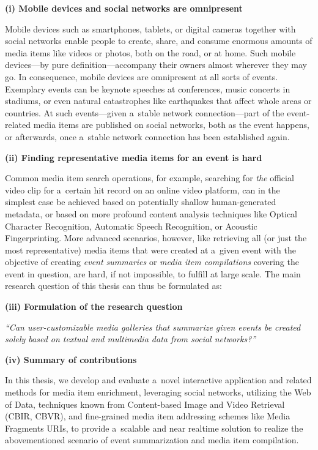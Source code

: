 
\begin{abstracts}

\textbf{(i) Mobile devices and social networks are omnipresent}

Mobile devices such as smartphones, tablets, or digital cameras
together with social networks enable people to create,
share, and consume enormous amounts of media items
like videos or photos, both on the road, or at home.
Such mobile devices---by pure definition---accompany
their owners almost wherever they may go.
In consequence, mobile devices are omnipresent
at all sorts of events.
Exemplary events can be keynote speeches at conferences,
music concerts in stadiums,
or even natural catastrophes like earthquakes
that affect whole areas or countries.
At such events---given a~stable network connection---part of
the event-related media items are published on social networks,
both as the event happens, or afterwards,
once a~stable network connection has been established again.

\textbf{(ii) Finding representative media items
for an event is hard}

Common media item search operations,
for example, searching for \emph{the} official video clip
for a~certain hit record on an online video platform,
can in the simplest case be achieved based on potentially
shallow human-generated metadata,
or based on more profound content analysis techniques
like Optical Character Recognition,
Automatic Speech Recognition,
or Acoustic Fingerprinting.
More advanced scenarios, however, like retrieving all
(or just the most representative) media items
that were created at a~given event
with the objective of creating \emph{event summaries} or
\emph{media item compilations} covering the event in question,
are hard, if not impossible, to fulfill at large scale.
The main research question of this thesis
can thus be formulated as:

\textbf{(iii) Formulation of the research question}

\textit{``Can user-customizable media galleries
that summarize given events be\linebreak
created solely based on textual and multimedia data
from social networks?''}

\textbf{(iv) Summary of contributions}

In this thesis, we develop and evaluate
a~novel interactive application and related methods
for media item enrichment,
leveraging social networks, utilizing the Web of Data,
techniques known from Content-based Image and
Video Retrieval (CBIR, CBVR),
and fine-grained media item addressing schemes
like Media Fragments URIs,
to provide a~scalable and near realtime solution
to realize the abovementioned scenario
of event summarization and media item compilation.


\end{abstracts}
